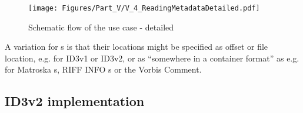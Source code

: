 \begin{figure}[H]
	\centering
	\texttt{[image: Figures/Part\_V/V\_4\_ReadingMetadataDetailed.pdf]}
	\caption{Schematic flow of the use case \UCreadMetadata{} - detailed}
	\label{fig:V_4_ReadingMetadataDetailed.pdf}
\end{figure}

A variation for \TERMtag{}s is that their locations might be specified as offset or file location, e.g. for ID3v1 or ID3v2, or as ``somewhere in a container format'' as e.g. for Matroska \TERMtag{}s, RIFF INFO \TERMtag{}s or the Vorbis Comment.


\subsection{ID3v2 implementation}
\label{sec:ID3v2implementation}

%
%
